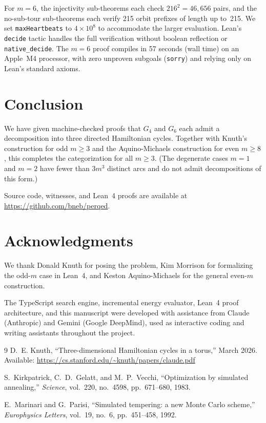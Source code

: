 \documentclass[11pt]{article}
\theoremstyle{plain}
\begin{document}
For $m=6$, the injectivity sub-theorems each check $216^2 = 46{,}656$ pairs,
and the no-sub-tour sub-theorems each verify 215 orbit prefixes of length
up to~215. We set \texttt{maxHeartbeats} to $4 \times 10^8$ to accommodate
the larger evaluation. Lean's \texttt{decide} tactic handles the full
verification without boolean reflection or \texttt{native\_decide}.
The $m=6$ proof compiles in 57 seconds (wall time) on an Apple~M4
processor, with zero unproven subgoals (\texttt{sorry}) and relying
only on Lean's standard axioms.

\section{Conclusion}

We have given machine-checked proofs that $G_4$ and $G_6$ each admit a
decomposition into three directed Hamiltonian cycles. Together with
Knuth's construction for odd $m \ge 3$ and the Aquino-Michaels construction
for even $m \ge 8$, this completes the categorization for all $m \ge 3$.
(The degenerate cases $m=1$ and $m=2$ have fewer than $3m^3$ distinct arcs
and do not admit decompositions of this form.)

Source code, witnesses, and Lean~4 proofs are available at
\url{https://github.com/bneb/perqed}.

\section*{Acknowledgments}

We thank Donald Knuth for posing the problem, Kim Morrison for formalizing
the odd-$m$ case in Lean~4, and Keston Aquino-Michaels for the general
even-$m$ construction.

The TypeScript search engine, incremental energy evaluator, Lean~4 proof
architecture, and this manuscript were developed with assistance from
Claude (Anthropic) and Gemini (Google DeepMind), used as interactive
coding and writing assistants throughout the project.

\begin{thebibliography}{9}
D.~E. Knuth, ``Three-dimensional Hamiltonian cycles in a torus,''
March 2026. Available: \url{https://cs.stanford.edu/~knuth/papers/claude.pdf}

S.~Kirkpatrick, C.~D.~Gelatt, and M.~P.~Vecchi, ``Optimization by simulated
annealing,'' \emph{Science}, vol.~220, no.~4598, pp.~671--680, 1983.

E.~Marinari and G.~Parisi, ``Simulated tempering: a new Monte Carlo scheme,''
\emph{Europhysics Letters}, vol.~19, no.~6, pp.~451--458, 1992.

\end{thebibliography}
\end{document}
